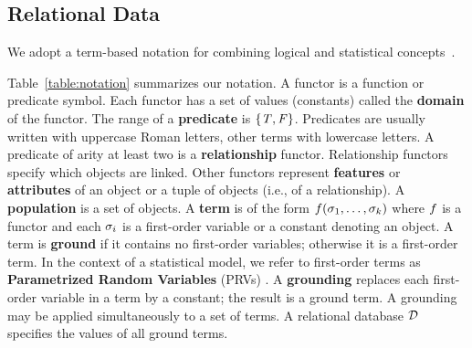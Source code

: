 {\subsection{Relational Data}





We adopt a term-based notation for combining logical and statistical concepts~\cite{Poole2003,Kimmig2014}. {Table~\ref{table:notation} summarizes our notation.
A functor is a function or predicate symbol. Each functor has a set of values (constants) called the \textbf{domain} of the functor. The range of a \textbf{predicate} is $\{\mathit{T},\mathit{F}\}$. Predicates are usually written with uppercase Roman letters, other terms with lowercase letters.
A predicate of arity at least two is a \textbf{relationship} functor. Relationship functors specify which objects are linked. Other functors represent \textbf{features} or \textbf{attributes} of an object or a tuple of objects (i.e., of a relationship).
A \textbf{population} is a set of objects. 
A \textbf{term} is of the form $f(\sigma_{1},\ldots,\sigma_{k})$ where $f$ is a functor %
and each $\sigma_{i}$ is a first-order variable or a constant denoting an object. A term is \textbf{ground} if it contains no first-order variables; otherwise it is a first-order term. In the context of a statistical model, we refer to first-order terms as \textbf{Parametrized Random Variables} (PRVs) \cite{Kimmig2014}. 
A \textbf{grounding} replaces each first-order variable in a term by a constant; the result is a ground term. A grounding may be applied simultaneously to a set of terms.  A relational database $\mathcal{D}$ specifies the values of all ground terms. %

}}
